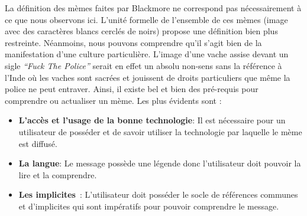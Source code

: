 La d\'efinition des m\`emes faites par Blackmore ne correspond pas n\'ecessairement \`a ce que nous observons ici. L{\textquoteright}unit\'e formelle de l{\textquoteright}ensemble de ces m\`emes (image avec des caract\`eres blancs cercl\'es de noirs) propose une d\'efinition bien plus restreinte. N\'eanmoins, nous pouvons comprendre qu{\textquoteright}il s{\textquoteright}agit bien de la manifestation d{\textquoteright}une culture particuli\`ere. L{\textquoteright}image d{\textquoteright}une vache assise devant un sigle \textit{{\textquotedblleft}Fuck The Police{\textquotedblright} }serait en effet un absolu non-sens sans la r\'ef\'erence \`a l{\textquoteright}Inde o\`u les vaches sont sacr\'ees et jouissent de droits particuliers que m\^eme la police ne peut entraver. Ainsi, il existe bel et bien des pr\'e-requis pour comprendre ou actualiser un m\`eme. Les plus \'evidents sont :

\begin{itemize}
    \item \textbf{L’accès et l’usage de la bonne technologie}: Il est nécessaire pour un utilisateur de posséder et de savoir utiliser la technologie par laquelle le mème est diffusé.
    \item \textbf{La langue}: Le message possède une légende donc l’utilisateur doit pouvoir la lire et la comprendre.
    \item \textbf{Les implicites} : L’utilisateur doit posséder le socle de références communes et d’implicites qui sont impératifs pour pouvoir comprendre le message. 
\end{itemize}

